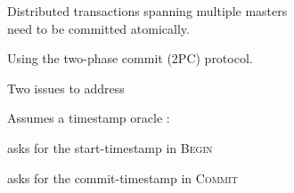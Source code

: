 \begin{frame}{}
  \begin{center}
    \begin{minipage}{1.0\textwidth}
      
    \end{minipage}
  \end{center}
\end{frame}

\begin{frame}{}
  \begin{center}
  \end{center}
\end{frame}

\begin{frame}{}
  \begin{center}
    \begin{minipage}{1.0\textwidth}
      
    \end{minipage}
  \end{center}
\end{frame}

\begin{frame}{}
  \begin{center}
    Distributed transactions spanning multiple masters \\
    need to be committed atomically.

    \pause
    \vspace{0.40cm}
    Using the two-phase commit (2PC) protocol.

    \pause
    \vspace{1.00cm}
    Two issues to address
  \end{center}
\end{frame}

\begin{frame}{}
  Assumes a timestamp oracle :
  \begin{description}[Coordinator:]
    \item[Client:] asks for the start-timestamp in \textsc{Begin}
    \item[Coordinator:] asks for the commit-timestamp in \textsc{Commit}
  \end{description}
\end{frame}

